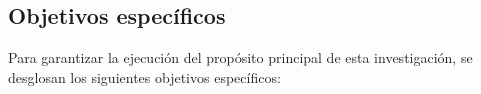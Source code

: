 \subsection{Objetivos específicos}
Para garantizar la ejecución del propósito principal de esta investigación, se desglosan los siguientes objetivos específicos:


